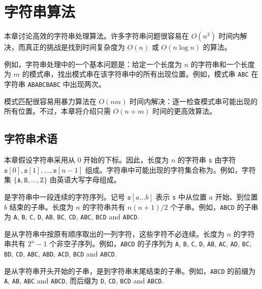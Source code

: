 \chapter{字符串算法}

本章讨论高效的字符串处理算法。许多字符串问题很容易在 $O(n^2)$ 时间内解决，而真正的挑战是找到时间复杂度为 $O(n)$ 或 $O(n \log n)$ 的算法。


例如，字符串处理中的一个基本问题是：给定一个长度为 $n$ 的字符串和一个长度为 $m$ 的模式串，找出模式串在该字符串中的所有出现位置。例如，模式串 \texttt{ABC} 在字符串 \texttt{ABABCBABC} 中出现两次。

模式匹配很容易用暴力算法在 $O(nm)$ 时间内解决：逐一检查模式串可能出现的所有位置。不过，本章将介绍只需 $O(n+m)$ 时间的更高效算法。


\section{字符串术语}


本章假设字符串采用从 0 开始的下标。因此，长度为 $n$ 的字符串 \texttt{s} 由字符 $\texttt{s}[0],\texttt{s}[1],\ldots,\texttt{s}[n-1]$ 组成。字符串中可能出现的字符集合称为。例如，字符集 $\{\texttt{A},\texttt{B},\ldots,\texttt{Z}\}$ 由英语大写字母组成。


是字符串中一段连续的字符序列。记号 $\texttt{s}[a \ldots b]$ 表示 \texttt{s} 中从位置 $a$ 开始、到位置 $b$ 结束的子串。长度为 $n$ 的字符串共有 $n(n+1)/2$ 个子串。例如，\texttt{ABCD} 的子串为
\texttt{A}, \texttt{B}, \texttt{C}, \texttt{D},
\texttt{AB}, \texttt{BC}, \texttt{CD},
\texttt{ABC}, \texttt{BCD} and \texttt{ABCD}.


是从字符串中按原有顺序取出的一列字符，这些字符不必连续。长度为 $n$ 的字符串共有 $2^n-1$ 个非空子序列。例如，\texttt{ABCD} 的子序列为
\texttt{A}, \texttt{B}, \texttt{C}, \texttt{D},
\texttt{AB}, \texttt{AC}, \texttt{AD},
\texttt{BC}, \texttt{BD}, \texttt{CD},
\texttt{ABC}, \texttt{ABD}, \texttt{ACD},
\texttt{BCD} and \texttt{ABCD}.


是从字符串开头开始的子串，是到字符串末尾结束的子串。例如，\texttt{ABCD} 的前缀为
\texttt{A}, \texttt{AB}, \texttt{ABC} and \texttt{ABCD},
而后缀为
\texttt{D}, \texttt{CD}, \texttt{BCD} and \texttt{ABCD}.

